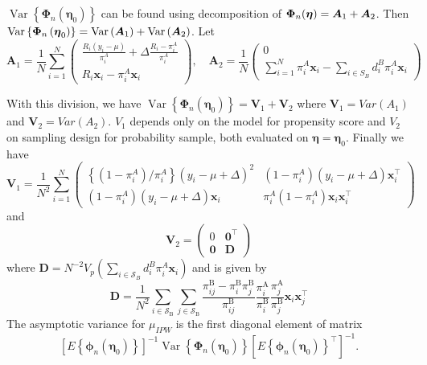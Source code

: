 \documentclass[
  letterpaper,
  DIV=11,
  numbers=noendperiod]{scrreprt}
\begin{document}
\(\operatorname{Var}\left\{\boldsymbol{\Phi}_n\left(\boldsymbol{\eta}_0\right)\right\}\)
can be found using decomposition of
\(\boldsymbol{\Phi}_n(\boldsymbol{\eta}) = \boldsymbol{A}_1 + \boldsymbol{A}_2\). Then
\(\operatorname{Var}\left\{\boldsymbol{\Phi}_n\left(\boldsymbol{\eta}_0\right)\right\} = \operatorname{Var}\left(\boldsymbol{A}_1\right) + \operatorname{Var}\left(\boldsymbol{A}_2\right)\).
Let \[
\mathbf{A}_1=\frac{1}{N} \sum_{i=1}^N\left(\begin{array}{c}
\frac{R_i\left(y_i-\mu\right)}{\pi_i^A}+\Delta \frac{R_i-\pi_i^A}{\pi_i^A} \\
R_i \boldsymbol{x}_i-\pi_i^A \boldsymbol{x}_i
\end{array}\right), \quad \mathbf{A}_2=\frac{1}{N}\left(\begin{array}{c}
0 \\
\sum_{i=1}^N \pi_i^A \boldsymbol{x}_i-\sum_{i \in S_B} d_i^B \pi_i^A \boldsymbol{x}_i
\end{array}\right)
\]

With this division, we have
\(\operatorname{Var}\left\{\boldsymbol{\Phi}_n\left(\boldsymbol{\eta}_0\right)\right\}=\mathbf{V}_1+\mathbf{V}_2\)
where \(\mathbf{V}_1 = Var \left(A_1\right)\) and
\(\mathbf{V}_2 = Var \left(A_2\right)\). \(V_1\) depends only on the
model for propensity score and \(V_2\) on sampling design for
probability sample, both evaluated on
\(\boldsymbol{\eta} = \boldsymbol{\eta}_0\). Finally we have \[
\mathbf{V}_1=\frac{1}{N^2} \sum_{i=1}^N\left(\begin{array}{cc}
\left\{\left(1-\pi_i^A\right) / \pi_i^A\right\}\left(y_i-\mu+\Delta\right)^2 & \left(1-\pi_i^A\right)\left(y_i-\mu+\Delta\right) \boldsymbol{x}_i^{\top} \\
\left(1-\pi_i^A\right)\left(y_i-\mu+\Delta\right) \boldsymbol{x}_i & \pi_i^A\left(1-\pi_i^A\right) \boldsymbol{x}_i \boldsymbol{x}_i^{\top}
\end{array}\right)
\] and \[
\mathbf{V}_2=\left(\begin{array}{ll}
0 & \mathbf{0}^{\top} \\
\mathbf{0} & \mathbf{D}
\end{array}\right)
\] where
\(\mathbf{D}=N^{-2} V_p\left(\sum_{i \in \mathcal{S}_B} d_i^B \pi_i^A \boldsymbol{x}_i\right)\)
and is given by \[
\begin{equation}
{\mathbf{D}}=\frac{1}{N^2} \sum_{i \in \mathcal{S}_{\mathrm{B}}} \sum_{j \in \mathcal{S}_{\mathrm{B}}} \frac{\pi_{i j}^{\mathrm{B}}-\pi_i^{\mathrm{B}} \pi_j^{\mathrm{B}}}{\pi_{i j}^{\mathrm{B}}} \frac{{\pi}_i^{\mathrm{A}}}{\pi_i^{\mathrm{B}}} \frac{{\pi}_j^{\mathrm{A}}}{\pi_j^{\mathrm{B}}} \boldsymbol{x}_i \boldsymbol{x}_j^{\top}
\end{equation}
\] The asymptotic variance for \(\mu_{IPW}\) is the first diagonal
element of matrix \[
\left[E\left\{\boldsymbol{\phi}_n\left(\boldsymbol{\eta}_0\right)\right\}\right]^{-1} \operatorname{Var}\left\{\boldsymbol{\Phi}_n\left(\boldsymbol{\eta}_0\right)\right\}\left[E\left\{\boldsymbol{\phi}_n\left(\boldsymbol{\eta}_0\right)\right\}^{\top}\right]^{-1}.
\]
\end{document}
